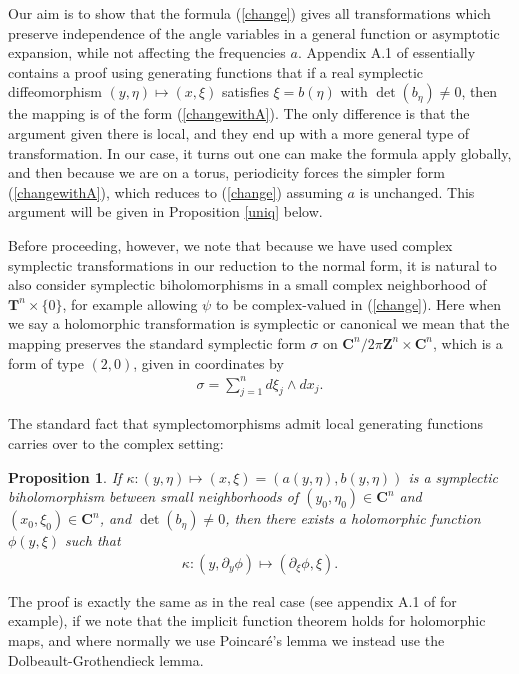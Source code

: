 \documentclass[12pt,lettersize]{article}
\theoremstyle{plain}%
\newtheorem{prop}[theorem]{Proposition}
\numberwithin{theorem}{section}
\numberwithin{equation}{section}
\theoremstyle{definition}
\theoremstyle{remark}
\begin{document}
{Our aim is to show that the formula (\ref{change}) gives all transformations which preserve independence of the angle variables in a general function or asymptotic expansion, while not affecting the frequencies $a$. Appendix A.1 of \cite{HoferZehnder} essentially contains a proof using generating functions that if a real symplectic diffeomorphism $(y,\eta)\mapsto (x,\xi)$ satisfies $\xi = b(\eta)$ with $\det(b_\eta) \neq 0$, then the mapping is of the form (\ref{changewithA}). The only difference is that the argument given there is local, and they end up with a more general type of transformation. In our case, it turns out one can make the formula apply globally, and then because we are on a torus, periodicity forces the simpler form (\ref{changewithA}), which reduces to (\ref{change}) assuming $a$ is unchanged. This argument will be given in Proposition \ref{uniq} below. 

Before proceeding, however, we note that because we have used complex symplectic transformations in our reduction to the normal form, it is natural to also consider symplectic biholomorphisms in a small complex neighborhood of $\mathbf{T}^n \times \{0\}$, for example allowing $\psi$ to be complex-valued in (\ref{change}). Here when we say a holomorphic transformation is symplectic or canonical we mean that the mapping preserves the standard symplectic form $\sigma$ on $\mathbf{C}^n / 2\pi \mathbf{Z}^n \times \mathbf{C}^n$, which is a form of type $(2,0)$, given in coordinates by 
%
\begin{align*}
\sigma = \sum_{j=1}^n d\xi_j \wedge dx_j.
\end{align*}

The standard fact that symplectomorphisms admit local generating functions carries over to the complex setting: 
%
\begin{prop}\label{genfn}
If $\kappa : (y,\eta)\mapsto (x,\xi) = (a(y,\eta),b(y,\eta))$ is a symplectic biholomorphism between small neighborhoods of $(y_0,\eta_0)\in \mathbf{C}^n$ and $(x_0,\xi_0)\in \mathbf{C}^n$, and $\det(b_\eta)\neq 0$, then there exists a holomorphic function $\phi(y,\xi)$ such that 
%
\begin{align*}
\kappa: (y,\partial_y \phi) \mapsto (\partial_\xi \phi, \xi). 
\end{align*}
%
\end{prop}

The proof is exactly the same as in the real case (see appendix A.1 of \cite{HoferZehnder} for example), if we note that the implicit function theorem holds for holomorphic maps, and where normally we use Poincar\'e's lemma we instead use the Dolbeault-Grothendieck lemma.%

}
\end{document}
